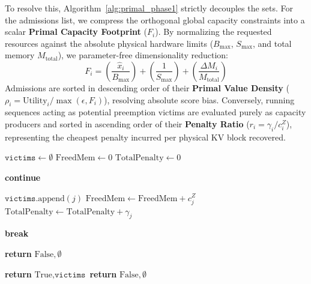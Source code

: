 \documentclass[11pt]{article}
\begin{document}
To resolve this, Algorithm~\ref{alg:primal_phase1} strictly decouples the sets. For the admissions list, we compress the orthogonal global capacity constraints into a scalar \textbf{Primal Capacity Footprint} ($F_i$). By normalizing the requested resources against the absolute physical hardware limits ($B_{\max}$, $S_{\max}$, and total memory $M_{\text{total}}$), we parameter-free dimensionality reduction:
\begin{equation}
    F_i = \left( \frac{\hat{x}_i}{B_{\max}} \right) + \left( \frac{1}{S_{\max}} \right) + \left( \frac{\Delta M_i}{M_{\text{total}}} \right)
\end{equation}
Admissions are sorted in descending order of their \textbf{Primal Value Density} ($\rho_i = \text{Utility}_i / \max(\epsilon, F_i)$), resolving absolute score bias. Conversely, running sequences acting as potential preemption victims are evaluated purely as capacity producers and sorted in ascending order of their \textbf{Penalty Ratio} ($r_i = \gamma_i / c_i^Z$), representing the cheapest penalty incurred per physical KV block recovered.

\begin{algorithm}[t]
\caption{Primal Subroutine: Lazy Eviction Decision Check}
\label{alg:primal_lazy_evict}
\begin{algorithmic}[1]
    \State $\texttt{victims} \gets \emptyset$
    \State $\text{FreedMem} \gets 0$
    \State $\text{TotalPenalty} \gets 0$
    
            \State \textbf{continue} 
        \EndIf
        
        \State $\texttt{victims}.\text{append}(j)$
        \State $\text{FreedMem} \gets \text{FreedMem} + c_j^Z$
        \State $\text{TotalPenalty} \gets \text{TotalPenalty} + \gamma_j$
        
            \State \textbf{break} 
        \EndIf
    \EndFor
    
        \State \textbf{return} $\text{False}, \emptyset$ 
    \EndIf
    
    \State {}
        \State \textbf{return} $\text{True}, \texttt{victims}$ 
    \Else
        \State \textbf{return} $\text{False}, \emptyset$ 
    \EndIf
\EndProcedure
\end{algorithmic}
\end{algorithm}
\end{document}
